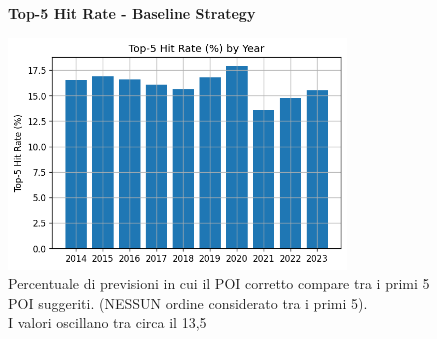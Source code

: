 \begin{enumerate}
\begin{figure}[H]
\centering
\textbf{Top-5 Hit Rate - Baseline Strategy}\par
\vspace{0.5em}
\includegraphics[width=0.8\textwidth]{../../img/no_SPACE-GEO_n-1_come_current_POI/top5_hit_rate.png}
\caption{Percentuale di previsioni in cui il POI corretto compare tra i primi 5 POI suggeriti. (NESSUN ordine considerato tra i primi 5).\\ I valori oscillano tra circa il 13,5%
}
\label{fig:baseline_top5}
\end{figure}


\end{enumerate}
